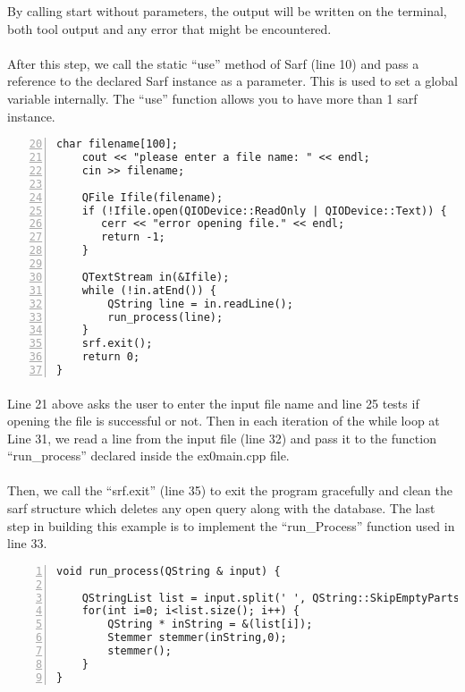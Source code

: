 \documentclass{article}
\begin{document}
By calling start without parameters, the output will be written on the terminal, both tool output and any error that might be encountered.

\paragraph{}
After this step, we call the static ``use'' method of Sarf (line 10) and pass a reference to the declared Sarf instance as a parameter. This is used to set a global variable internally. The ``use'' function allows you to have more than 1 sarf instance.

\begin{Verbatim}[numbers=left,firstnumber=20]
    char filename[100];
    cout << "please enter a file name: " << endl;
    cin >> filename;

    QFile Ifile(filename);
    if (!Ifile.open(QIODevice::ReadOnly | QIODevice::Text)) {
       cerr << "error opening file." << endl;
       return -1;
    }

    QTextStream in(&Ifile);
    while (!in.atEnd()) {
        QString line = in.readLine();
        run_process(line);
    }
    srf.exit();
    return 0;
}
\end{Verbatim}

\paragraph{}
Line 21 above asks the user to enter the input file name and line 25 tests if opening the file is successful or not. Then in each iteration of the while loop at Line 31, we read a line from the 
input file (line 32) and pass it to the function ``run\_process'' declared inside the ex0main.cpp file.

\paragraph{}
Then,  we call the ``srf.exit'' (line 35) to exit the program gracefully and clean the sarf structure which deletes any open query along with the database. The last step in building this example is to implement the ``run\_Process'' function used in line 33.

\begin{Verbatim}[numbers=left]
void run_process(QString & input) {

    QStringList list = input.split(' ', QString::SkipEmptyParts);
    for(int i=0; i<list.size(); i++) {
        QString * inString = &(list[i]);
        Stemmer stemmer(inString,0);
        stemmer();
    }
}
\end{Verbatim}
\end{document}
